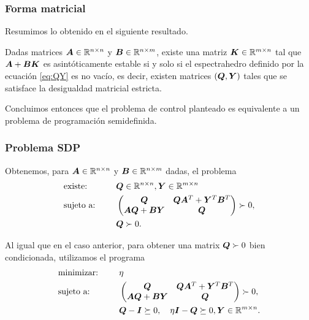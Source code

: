 \documentclass[aspectratio=169,12pt,spanish]{beamer}
\begin{document}

\begin{frame}
\frametitle{Forma matricial}

Resumimos lo obtenido en el siguiente resultado.

\begin{theorem}
Dadas matrices $\bm{A} \in \mathbb{R}^{n\times n}$ y $\bm{B} \in \mathbb{R}^{n \times m}$, existe una matriz $\bm{K} \in \mathbb{R}^{m \times n}$ tal que $\bm{A} + \bm{B}\bm{K}$ es asintóticamente estable si y solo si el espectrahedro definido por la ecuación \eqref{eq:QY} es no vacío, es decir, existen matrices $(\bm{Q}, \bm{Y})$ tales que se satisface la desigualdad matricial estricta.
\end{theorem}

Concluimos entonces que el problema de control planteado es equivalente a un problema de programación semidefinida.

\end{frame}



\begin{frame}
\frametitle{Problema SDP}

Obtenemos, para $\bm{A} \in \mathbb{R}^{n\times n}$ y $\bm{B} \in \mathbb{R}^{n \times m}$ dadas, el problema
\begin{alignat*}{2}
  & \text{existe: } & & \bm{Q} \in \mathbb{R}^{n\times n}, \bm{Y} \in \mathbb{R}^{m \times n} \\
   & \text{sujeto a: } & \quad &
\begin{pmatrix}
\bm{Q} & \bm{Q}\bm{A}^T + \bm{Y}^T\bm{B}^T  \\
\bm{A}\bm{Q} + \bm{B}\bm{Y} & \bm{Q}
\end{pmatrix}  \succ 0, \\
   &&& \bm{Q} \succ 0.
\end{alignat*}

Al igual que en el caso anterior, para obtener una matrix $\bm{Q} \succ 0$ bien condicionada, utilizamos el programa
\begin{alignat*}{2}
  & \text{minimizar: } & & \eta \\
   & \text{sujeto a: } & \quad &
\begin{pmatrix}
\bm{Q} & \bm{Q}\bm{A}^T + \bm{Y}^T\bm{B}^T  \\
\bm{A}\bm{Q} + \bm{B}\bm{Y} & \bm{Q}
\end{pmatrix}  \succ 0, \\
   &&& \bm{Q} - \bm{I} \succeq 0, \quad \eta \bm{I} - \bm{Q} \succeq 0, \bm{Y} \in \mathbb{R}^{m \times n}.
\end{alignat*}

\end{frame}
\end{document}
